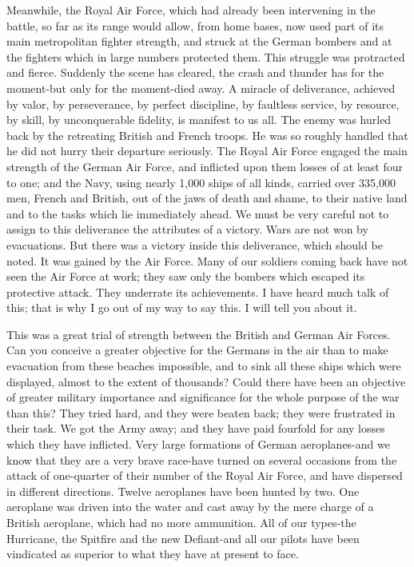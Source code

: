 \documentclass[a4paper]{amsbook}
\begin{document}
Meanwhile, the Royal Air Force, which had already been intervening in the battle, so far as its range would allow, from home bases, now used part of its main metropolitan fighter strength, and struck at the German bombers and at the fighters which in large numbers protected them. This struggle was protracted and fierce. Suddenly the scene has cleared, the crash and thunder has for the moment-but only for the moment-died away. A miracle of deliverance, achieved by valor, by perseverance, by perfect discipline, by faultless service, by resource, by skill, by unconquerable fidelity, is manifest to us all. The enemy was hurled back by the retreating British and French troops. He was so roughly handled that he did not hurry their departure seriously. The Royal Air Force engaged the main strength of the German Air Force, and inflicted upon them losses of at least four to one; and the Navy, using nearly 1,000 ships of all kinds, carried over 335,000 men, French and British, out of the jaws of death and shame, to their native land and to the tasks which lie immediately ahead. We must be very careful not to assign to this deliverance the attributes of a victory. Wars are not won by evacuations. But there was a victory inside this deliverance, which should be noted. It was gained by the Air Force. Many of our soldiers coming back have not seen the Air Force at work; they saw only the bombers which escaped its protective attack. They underrate its achievements. I have heard much talk of this; that is why I go out of my way to say this. I will tell you about it.

This was a great trial of strength between the British and German Air Forces. Can you conceive a greater objective for the Germans in the air than to make evacuation from these beaches impossible, and to sink all these ships which were displayed, almost to the extent of thousands? Could there have been an objective of greater military importance and significance for the whole purpose of the war than this? They tried hard, and they were beaten back; they were frustrated in their task. We got the Army away; and they have paid fourfold for any losses which they have inflicted. Very large formations of German aeroplanes-and we know that they are a very brave race-have turned on several occasions from the attack of one-quarter of their number of the Royal Air Force, and have dispersed in different directions. Twelve aeroplanes have been hunted by two. One aeroplane was driven into the water and cast away by the mere charge of a British aeroplane, which had no more ammunition. All of our types-the Hurricane, the Spitfire and the new Defiant-and all our pilots have been vindicated as superior to what they have at present to face.
\end{document}
